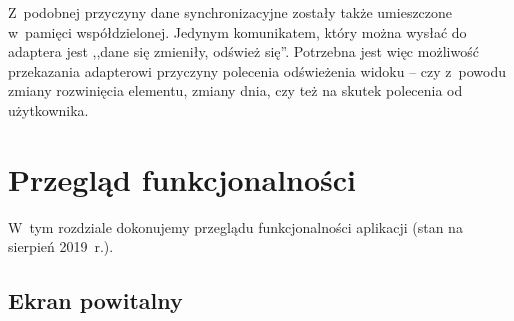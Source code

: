 \documentclass{pracamgr}
\begin{document}
Z~podobnej przyczyny dane synchronizacyjne zostały także umieszczone w~pamięci współdzielonej.
Jedynym komunikatem, który można wysłać do adaptera jest ,,dane się zmieniły, odśwież się''.
Potrzebna jest więc możliwość przekazania adapterowi przyczyny polecenia odświeżenia widoku --
czy z~powodu zmiany rozwinięcia elementu, zmiany dnia, czy też na skutek polecenia od użytkownika.

\chapter{Przegląd funkcjonalności}
\label{sec:przeglad}

W~tym rozdziale dokonujemy przeglądu funkcjonalności aplikacji (stan na sierpień 2019~r.).


\section{Ekran powitalny}
\end{document}
